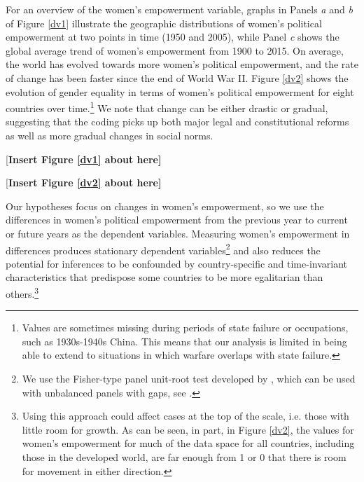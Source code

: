 \documentclass [12pt] {article}
\begin{document}
For an overview of the women's empowerment variable, graphs in Panels \emph{a} and \emph{b} of Figure \ref{dv1} illustrate the geographic distributions of women's political empowerment at two points in time (1950 and 2005), while Panel \emph{c} shows the global average trend of women's empowerment from 1900 to 2015. On average, the world has evolved towards more women's political empowerment, and the rate of change has been faster since the end of World War II. Figure \ref{dv2} shows the evolution of gender equality in terms of women's political empowerment for eight countries over time.\footnote{Values are sometimes missing during periods of state failure or occupations, such as 1930s-1940s China. This means that our analysis is limited in being able to extend to situations in which warfare overlaps with state failure.} We note that change can be either drastic or gradual, suggesting that the coding picks up both major legal and constitutional reforms as well as more gradual changes in social norms.  \\


\begin{center}
[\bf Insert Figure \ref{dv1} about here]
\end{center}
\vspace*{.2in}

\begin{center}
[\bf Insert Figure \ref{dv2}  about here]
\end{center}
\vspace*{.2in}

Our hypotheses focus on changes in women's empowerment, so we use the differences in women's political empowerment from the previous year to current or future years as the dependent variables. Measuring women's empowerment in differences produces stationary dependent variables\footnote{We use the Fisher-type panel unit-root test developed by \citeauthor{choi:2001}, which can be used with unbalanced panels with gaps, see .} and also reduces the potential for inferences to be confounded by country-specific and time-invariant characteristics that predispose some countries to be more egalitarian than others.\footnote{Using this approach could affect cases at the top of the scale, i.e. those with little room for growth. As can be seen, in part, in Figure \ref{dv2}, the values for women's empowerment for much of the data space for all countries, including those in the developed world, are far enough from 1 or 0 that there is room for movement in either direction.} \\
\end{document}
